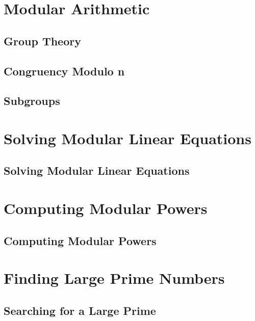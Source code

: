 \documentclass{beamer}
\begin{document}
\section{Modular Arithmetic}

\subsection{Group Theory}

\subsection{Congruency Modulo n}



\subsection{Subgroups}

\section{Solving Modular Linear Equations}

\subsection{Solving Modular Linear Equations}

\section{Computing Modular Powers}

\subsection{Computing Modular Powers}

\section{Finding Large Prime Numbers}

\subsection{Searching for a Large Prime}
\end{document}
